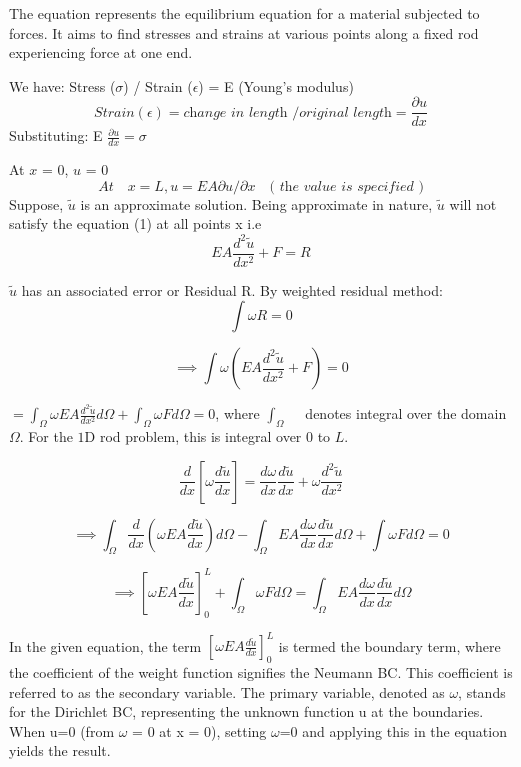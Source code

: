 \documentclass[10pt]{article}
\begin{document}
The equation represents the equilibrium equation for a material subjected to forces. It aims to find stresses and strains at various points along a fixed rod experiencing force at one end.

We have: Stress ($\sigma$) / Strain ($\epsilon$) = E (Young’s modulus)\\
\[
Strain (\epsilon) = \textit{change in length }/ \textit{original length} = \frac{\partial u}{dx}    
\]
Substituting: E $\frac{\partial u}{dx} = \sigma$ 

At $x$ = 0, $u$ = 0 
\begin{equation}
At \quad x = L, u = EA \partial u/\partial x  \quad \textit{( the value  is specified )}   
\end{equation}
Suppose, $\tilde{u}$ is an approximate solution. Being approximate in nature, $\tilde{u}$ will not
satisfy the equation (1) at all points x i.e
\begin{equation}
EA \frac{d^2 \tilde{u}}{dx^2} + F = R
\end{equation}

$\tilde{u}$ has an associated error or Residual R.
By weighted residual method:
\[
\int \omega R = 0
\]

\[
\implies \int \omega \left( EA \frac{d^2 \tilde{u}}{dx^2} + F \right) = 0
\]

$=\int_{\Omega} \omega E A \frac{d^{2} \tilde{u}}{d x^{2}} d \Omega+\int_{\Omega} \omega F d \Omega=0$, where $\int_{\Omega} \quad$ denotes integral over the domain $\Omega$. For the $1 \mathrm{D}$ rod problem, this is integral over 0 to $L$.

$$
\frac{d}{d x}\left[\omega \frac{d \tilde{u}}{d x}\right]=\frac{d \omega}{d x} \frac{d \tilde{u}}{d x}+\omega \frac{d^{2} \tilde{u}}{d x^{2}}
$$

$$
\implies \int_{\Omega} \frac{d}{d x}\left(\omega E A \frac{d \tilde{u}}{d x}\right) d \Omega-\int_{\Omega} E A \frac{d \omega}{d x} \frac{d \tilde{u}}{d x} d \Omega+\int \omega F d \Omega=0
$$

\begin{equation}
   \implies \left[\omega E A \frac{d \tilde{u}}{d x}\right]_{0}^{L}+\int_{\Omega} \omega F d \Omega=\int_{\Omega} E A \frac{d \omega}{d x} \frac{d \tilde{u}}{d x} d \Omega
\end{equation}

In the given equation, the term $\left[\omega E A \frac{d \widetilde{u}}{d x}\right]_{0}^{L}$ is termed the boundary term, where the coefficient of the weight function signifies the Neumann BC. This coefficient is referred to as the secondary variable. The primary variable, denoted as $\omega$, stands for the Dirichlet BC, representing the unknown function u at the boundaries. When u=0 (from $\omega$ = 0 at x = 0), setting $\omega$=0 and applying this in the equation yields the result.
\end{document}
